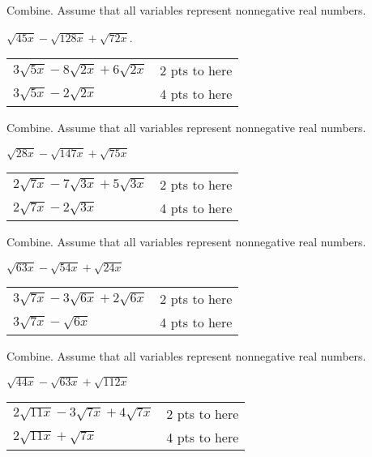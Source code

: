 {
	Combine. Assume that all variables represent nonnegative real numbers. 
	
	\noindent $\displaystyle \sqrt{45x}-\sqrt{128x}+\sqrt{72x}$.
}
{
	\begin{tabular}{l r}
	$3\sqrt{5x}-8\sqrt{2x}+6\sqrt{2x}$ & 2 pts to here\\
	$3\sqrt{5x}-2\sqrt{2x}$ & 4 pts to here
	\end{tabular}
}

{
	Combine. Assume that all variables represent nonnegative real numbers. 
	
	\noindent $\displaystyle \sqrt{28x}-\sqrt{147x}+\sqrt{75x}$
}
{
	\begin{tabular}{l r}
	$2\sqrt{7x}-7\sqrt{3x}+5\sqrt{3x}$ & 2 pts to here\\
	$2\sqrt{7x}-2\sqrt{3x}$ & 4 pts to here
	\end{tabular}
}

{
	Combine. Assume that all variables represent nonnegative real numbers. 
	
	\noindent $\displaystyle \sqrt{63x}-\sqrt{54x}+\sqrt{24x}$
}
{
	\begin{tabular}{l r}
	$3\sqrt{7x}-3\sqrt{6x}+2\sqrt{6x}$ & 2 pts to here\\
	$3\sqrt{7x}-\sqrt{6x}$ & 4 pts to here
	\end{tabular}
}

{
	Combine. Assume that all variables represent nonnegative real numbers. 
	
	\noindent $\displaystyle \sqrt{44x}-\sqrt{63x}+\sqrt{112x}$
}
{
	\begin{tabular}{l r}
	$2\sqrt{11x}-3\sqrt{7x}+4\sqrt{7x}$ & 2 pts to here\\
	$2\sqrt{11x}+\sqrt{7x}$ & 4 pts to here
	\end{tabular}
}
